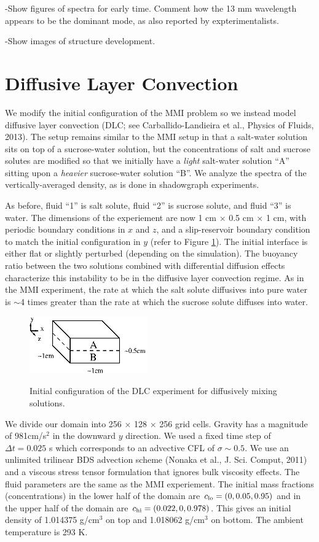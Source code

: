 \documentclass[final]{siamltex}
\begin{document}
-Show figures of spectra for early time.  Comment how the 13 mm wavelength appears to be the dominant mode,
 as also reported by expterimentalists.

-Show images of structure development.


\section{Diffusive Layer Convection}
We modify the initial configuration of the MMI problem so we instead model
diffusive layer convection (DLC; see  Carballido-Landieira et al., Physics of Fluids, 2013).  
The setup remains similar to the MMI setup in that a salt-water solution sits on top
of a sucrose-water solution, but the concentrations of salt and sucrose solutes are modified 
so that we initially have a {\it light} salt-water solution ``A'' sitting upon a {\it heavier} 
sucrose-water solution ``B''.  We analyze the spectra of the vertically-averaged density, as 
is done in shadowgraph experiments.

As before, fluid ``1'' is salt solute, fluid ``2'' is sucrose solute, and fluid ``3'' is water.
The dimensions of the experiement are now 1 cm $\times$ 0.5 cm $\times$ 1 cm, with
periodic boundary conditions in $x$ and $z$, and a slip-reservoir boundary condition to match 
the initial configuration in $y$ (refer to Figure \ref{fig:dlc}).
The initial interface is either flat or slightly perturbed (depending on the simulation).
The buoyancy ratio between the two solutions combined with 
differential diffusion effects characterize this instability to be in the diffusive layer convection regime.
As in the MMI experiment, the rate at which the salt solute diffusives into pure water is $\sim$4 times greater 
than the rate at which the sucrose solute diffuses into water.
\begin{figure}[hb]
\centering
\includegraphics[width=2in]{dlc}
\label{fig:dlc}
\caption{Initial configuration of the DLC experiment for diffusively mixing solutions.}
\end{figure}

We divide our domain into 256 $\times$ 128 $\times$ 256 grid cells.  Gravity has a magnitude of 
981cm/s$^2$ in the downward $y$ direction.  We used a fixed time step of $\Delta t = 0.025$ s which
corresponds to an advective CFL of $\sigma\sim 0.5$.  We use an unlimited trilinear
BDS advection scheme (Nonaka et al., J. Sci. Comput, 2011) and a viscous stress tensor formulation that 
ignores bulk viscosity effects.  The fluid parameters are the same as the MMI experiement.
The initial mass fractions (concentrations) in the 
lower half of the domain are $c_{\rm lo} = (0, 0.05, 0.95)$ and in the upper half of the domain
are $c_{\rm hi} = (0.022, 0, 0.978)$.  This gives an initial density of 1.014375 g/cm$^3$ on top 
and 1.018062 g/cm$^3$ on bottom.  The ambient temperature is 293 K.
\end{document}

